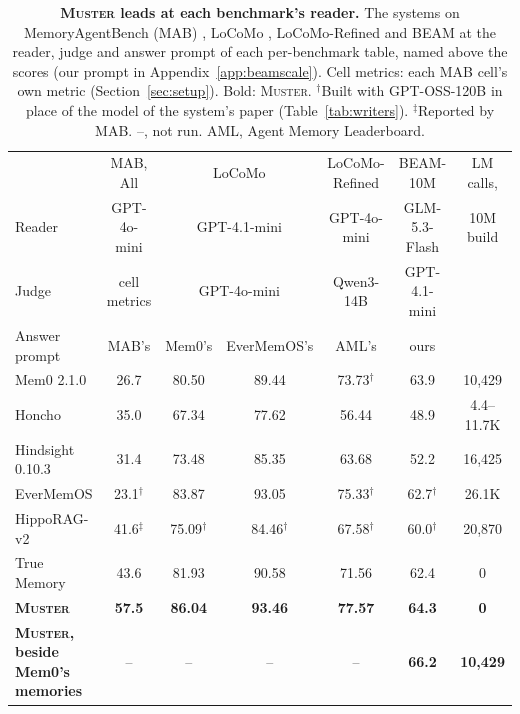 \documentclass{article}
\newcommand{\ours}{\rowcolor{oursbg}}
\newcommand{\tabfont}{\fontsize{7.5}{8.5}\selectfont\renewcommand{\arraystretch}{1.0}}
\newcommand{\sys}{\textsc{Muster}}
\begin{document}
\begin{table}[H]
\centering\tabfont
\caption{\textbf{\sys{} leads at each benchmark's reader.} The systems on MemoryAgentBench (MAB) \cite{mab}, LoCoMo \cite{locomo}, LoCoMo-Refined \cite{locomorefined} and BEAM \cite{beam} at the reader, judge and answer prompt of each per-benchmark table, named above the scores (our prompt in Appendix~\ref{app:beamscale}). Cell metrics: each MAB cell's own metric (Section~\ref{sec:setup}). Bold: \sys{}. $^{\dagger}$Built with GPT-OSS-120B in place of the model of the system's paper (Table~\ref{tab:writers}). $^{\ddagger}$Reported by MAB. --, not run. AML, Agent Memory Leaderboard.}
\label{tab:overviewstd}
\setlength{\tabcolsep}{3pt}
\begin{tabular}{lcccccc}
\toprule
 & MAB, All & \multicolumn{2}{c}{LoCoMo} & LoCoMo-Refined & BEAM-10M & LM calls, \\
\cmidrule(lr){3-4}
Reader & GPT-4o-mini & \multicolumn{2}{c}{GPT-4.1-mini} & GPT-4o-mini & GLM-5.3-Flash & 10M build \\
Judge & cell metrics & \multicolumn{2}{c}{GPT-4o-mini} & Qwen3-14B & GPT-4.1-mini & \\
Answer prompt & MAB's & Mem0's & EverMemOS's & AML's & ours & \\
\midrule
Mem0 2.1.0 \cite{mem0oss} & 26.7 & 80.50 & 89.44 & 73.73$^{\dagger}$ & 63.9 & 10{,}429 \\
Honcho \cite{honcho} & 35.0 & 67.34 & 77.62 & 56.44 & 48.9 & 4.4--11.7K \\
Hindsight 0.10.3 \cite{hindsight} & 31.4 & 73.48 & 85.35 & 63.68 & 52.2 & 16{,}425 \\
EverMemOS \cite{evermemos} & 23.1$^{\dagger}$ & 83.87 & 93.05 & 75.33$^{\dagger}$ & 62.7$^{\dagger}$ & 26.1K \\
HippoRAG-v2 \cite{hipporag2} & 41.6$^{\ddagger}$ & 75.09$^{\dagger}$ & 84.46$^{\dagger}$ & 67.58$^{\dagger}$ & 60.0$^{\dagger}$ & 20{,}870 \\
True Memory \cite{truememory} & 43.6 & 81.93 & 90.58 & 71.56 & 62.4 & 0 \\
\midrule
\ours \textbf{\sys{}} & \textbf{57.5} & \textbf{86.04} & \textbf{93.46} & \textbf{77.57} & \textbf{64.3} & \textbf{0} \\
\ours \textbf{\sys{}, beside Mem0's memories} & -- & -- & -- & -- & \textbf{66.2} & \textbf{10{,}429} \\
\bottomrule
\end{tabular}
\end{table}
\end{document}
